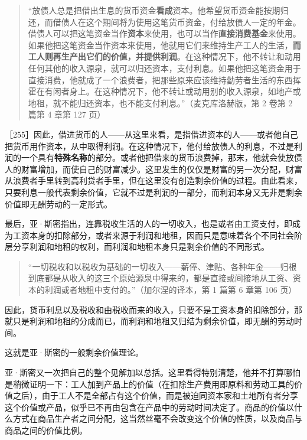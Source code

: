 \begin{quote}“放债人总是把借出生息的货币资金\textbf{看成}资本。他希望货币资金能按期归还，而借债人在这个期间将为使用这笔货币资金，付给放债人一定的年金。借债人可以把这笔资金当作\textbf{资本}来使用，也可以当作\textbf{直接消费基金}来使用。如果他把这笔资金当作资本来使用，他就用它们来维持生产工人的生活，\textbf{而工人则再生产出它们的价值，并提供利润}。在这种情况下，他不转让和动用任何其他的收入源泉，就可以归还资本，支付利息。如果他把这笔资金用于直接消费，他就成了一个浪费者，把那些原来应该维持勤劳者生活的东西挥霍在有闲者身上。在这种情况下，他不转让或动用别的收入源泉，如地产或地租，就不能归还资本，也不能支付利息。”（麦克库洛赫版，第 2 卷第 2 篇第 4 章第 127 页）\end{quote}

［255］因此，借进货币的人——从这里来看，是指借进资本的人——或者他自己把货币用作资本，从中取得利润。在这种情况下，他付给放债人的利息，不过是利润的一个具有\textbf{特殊名称}的部分。或者他把借来的货币浪费掉，那末，他就会使放债人的财富增加，而使自己的财富减少。这里发生的仅仅是财富的另一次分配，财富从浪费者手里转到高利贷者手里，但在这里没有创造剩余价值的过程。由此看来，只要利息一般代表剩余价值，它就不过是利润的一部分，而利润本身又无非是剩余价值即无酬劳动的一定形式。

最后，亚·斯密指出，连靠税收生活的人的一切收入，也是或者由工资支付，即成为工资本身的扣除部分，或者来源于利润和地租，因而只是意味着各个不同社会阶层分享利润和地租的权利，而利润和地租本身只是剩余价值的不同形式。

\begin{quote}“一切税收和以税收为基础的一切收入——薪俸、津贴、各种年金——归根到底都是从收入的这三个原始源泉中得来的，都是直接或间接地从工资、资本的利润或者地租中支付的。”（加尔涅的译本，第 1 篇第 6 章第 106 页）\end{quote}

因此，货币利息以及税收和由税收而来的收入，只要不是工资本身的扣除部分，那就只是利润和地租的分成而已，而利润和地租又归结为剩余价值，即无酬的劳动时间。

这就是亚·斯密的一般剩余价值理论。

亚·斯密又一次把自己的整个见解加以总括。这里看得特别清楚，他并不打算哪怕是稍微证明一下：工人加到产品上的价值（在扣除生产费用即原料和劳动工具的价值之后），由于工人不是全部占有这个价值，而是被迫同资本家和土地所有者分享这个价值或产品，似乎已不再由包含在产品中的劳动时间决定了。商品的价值以什么方式在商品生产者之间分配，这当然丝毫不会改变这个价值的性质，以及商品与商品之间的价值比例。


